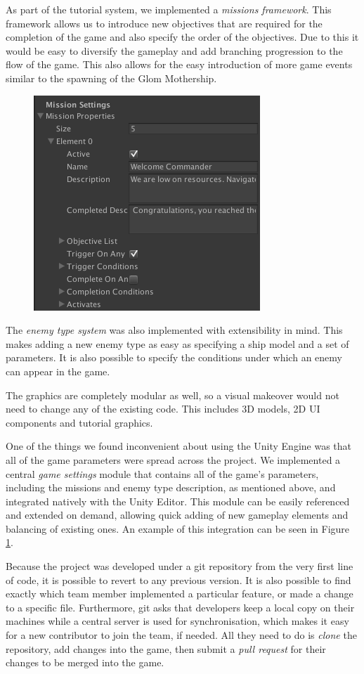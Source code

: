 \documentclass[a4paper,11pt]{article}
\begin{document}
As part of the tutorial system, we implemented a \emph{missions framework}. This framework allows us to introduce new objectives that are required for the completion of the game and also specify the order of the objectives. Due to this it would be easy to diversify the gameplay and add branching progression to the flow of the game. This also allows for the easy introduction of more game events similar to the spawning of the Glom Mothership.

\begin{figure}
	\centering
	\includegraphics[width=.32\textwidth]{modular_missions}
    \label{fig:modular_missions}
\end{figure}

The \emph{enemy type system} was also implemented with extensibility in mind. This makes adding a new enemy type as easy as specifying a ship model and a set of parameters. It is also possible to specify the conditions under which an enemy can appear in the game.

The graphics are completely modular as well, so a visual makeover would not need to change any of the existing code. This includes 3D models, 2D UI components and tutorial graphics.

One of the things we found inconvenient about using the Unity Engine was that all of the game parameters were spread across the project. We implemented a central \emph{game settings} module that contains all of the game's parameters, including the missions and enemy type description, as mentioned above, and integrated natively with the Unity Editor. This module can be easily referenced and extended on demand, allowing quick adding of new gameplay elements and balancing of existing ones. An example of this integration can be seen in Figure \ref{fig:modular_missions}.


Because the project was developed under a git repository from the very first line of code, it is possible to revert to any previous version. It is also possible to find exactly which team member implemented a particular feature, or made a change to a specific file. Furthermore, git asks that developers keep a local copy on their machines while a central server is used for synchronisation, which makes it easy for a new contributor to join the team, if needed. All they need to do is \emph{clone} the repository, add changes into the game, then submit a \emph{pull request} for their changes to be merged into the game.
\end{document}
